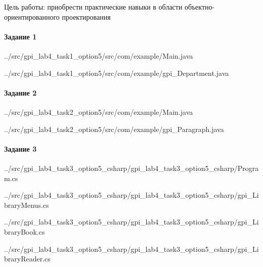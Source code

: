 Цель работы:
приобрести практические навыки в области объектно-ориентированного проектирования


\paragraph{Задание 1} \hspace{0pt}


{../src/gpi_lab4_task1_option5/src/com/example/Main.java}


{../src/gpi_lab4_task1_option5/src/com/example/gpi_Department.java}



\paragraph{Задание 2} \hspace{0pt}


{../src/gpi_lab4_task2_option5/src/com/example/Main.java}


{../src/gpi_lab4_task2_option5/src/com/example/gpi_Paragraph.java}



\paragraph{Задание 3} \hspace{0pt}


{../src/gpi_lab4_task3_option5_csharp/gpi_lab4_task3_option5_csharp/Program.cs}


{../src/gpi_lab4_task3_option5_csharp/gpi_lab4_task3_option5_csharp/gpi_LibraryMenus.cs}


{../src/gpi_lab4_task3_option5_csharp/gpi_lab4_task3_option5_csharp/gpi_LibraryBook.cs}


{../src/gpi_lab4_task3_option5_csharp/gpi_lab4_task3_option5_csharp/gpi_LibraryReader.cs}

\newpage
